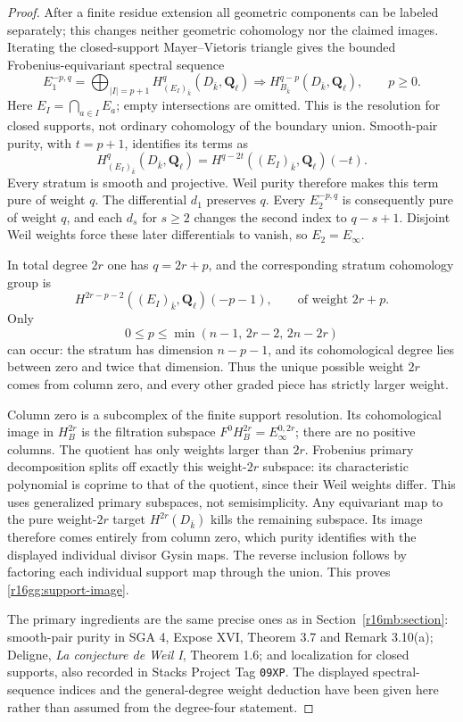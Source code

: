 \begin{proof}
After a finite residue extension all geometric components can be
labeled separately; this changes neither geometric cohomology nor
the claimed images. Iterating the closed-support Mayer--Vietoris
triangle gives the bounded Frobenius-equivariant spectral sequence
\[
 E_1^{-p,q}=\bigoplus_{|I|=p+1}H^q_{(E_I)_{\bar k}}
                  (D_{\bar k},\mathbf Q_\ell)
       \Longrightarrow H^{q-p}_{B_{\bar k}}(D_{\bar k},\mathbf Q_\ell),
                         \qquad p\geq0.
 \tag{GG16.2}\label{r16gg:support-sequence}
\]
Here $E_I=\bigcap_{a\in I}E_a$; empty intersections are omitted.
This is the resolution for closed supports, not ordinary cohomology
of the boundary union. Smooth-pair purity, with $t=p+1$, identifies
its terms as
\[
 H^q_{(E_I)_{\bar k}}(D_{\bar k},\mathbf Q_\ell)
                =H^{q-2t}((E_I)_{\bar k},\mathbf Q_\ell)(-t).
 \tag{GG16.3}\label{r16gg:purity}
\]
Every stratum is smooth and projective. Weil purity therefore
makes this term pure of weight $q$. The differential $d_1$
preserves $q$. Every $E_2^{-p,q}$ is consequently pure of
weight $q$, and each $d_s$ for $s\geq2$ changes the second
index to $q-s+1$. Disjoint Weil weights force these later
differentials to vanish, so $E_2=E_\infty$.

In total degree $2r$ one has $q=2r+p$, and the corresponding
stratum cohomology group is
\[
       H^{2r-p-2}((E_I)_{\bar k},\mathbf Q_\ell)(-p-1),
                    \qquad\text{of weight }2r+p.
 \tag{GG16.4}\label{r16gg:indices}
\]
Only
\[
       0\leq p\leq\min(n-1,\,2r-2,\,2n-2r)
\]
can occur: the stratum has dimension $n-p-1$, and its
cohomological degree lies between zero and twice that dimension.
Thus the unique possible weight $2r$ comes from column zero,
and every other graded piece has strictly larger weight.

Column zero is a subcomplex of the finite support resolution.
Its cohomological image in $H^{2r}_B$ is the filtration subspace
$F^0H^{2r}_B=E_\infty^{0,2r}$; there are no positive columns.
The quotient has only weights larger than $2r$. Frobenius
primary decomposition splits off exactly this weight-$2r$
subspace: its characteristic polynomial is coprime to that of
the quotient, since their Weil weights differ. This uses generalized
primary subspaces, not semisimplicity. Any equivariant map to
the pure weight-$2r$ target $H^{2r}(D_{\bar k})$ kills the
remaining subspace. Its image therefore comes entirely from
column zero, which purity identifies with the displayed individual
divisor Gysin maps. The reverse inclusion follows by factoring
each individual support map through the union. This proves
\eqref{r16gg:support-image}.

The primary ingredients are the same precise ones as in
Section~\ref{r16mb:section}: smooth-pair purity in SGA 4,
Expose XVI, Theorem 3.7 and Remark 3.10(a); Deligne,
\emph{La conjecture de Weil I}, Theorem 1.6; and localization
for closed supports, also recorded in Stacks Project Tag
\texttt{09XP}. The displayed spectral-sequence indices and
the general-degree weight deduction have been given here
rather than assumed from the degree-four statement.
\end{proof}

